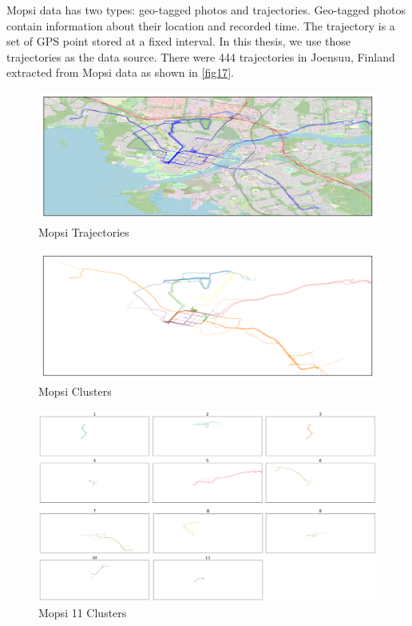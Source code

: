 \documentclass[a4paper, 12pt]{article}
\begin{document}
Mopsi data has two types: geo-tagged photos and trajectories. Geo-tagged photos contain information about their location and recorded time. The trajectory is a set of GPS point stored at a fixed interval. In this thesis, we use those trajectories as the data source. There were 444 trajectories in Joensuu, Finland extracted from Mopsi data as shown in \autoref{fig17}.

\begin{figure}[bp!]
    \centering
    \includegraphics[width=1\textwidth]{Mopsi Trajectories.png}
    \caption{Mopsi Trajectories}
    \label{fig17}
\end{figure}

\begin{figure}[bp!]
    \centering
    \includegraphics[width=1\textwidth]{Mopsi Clusters.png}
    \caption{Mopsi Clusters}
    \label{fig18}
\end{figure}

\pagebreak

\begin{figure}[htbp!]
    \centering
    \includegraphics[width=1\textwidth]{Mopsi 11 Clusters.png}
    \caption{Mopsi 11 Clusters}
    \label{fig19}
\end{figure}
\end{document}
